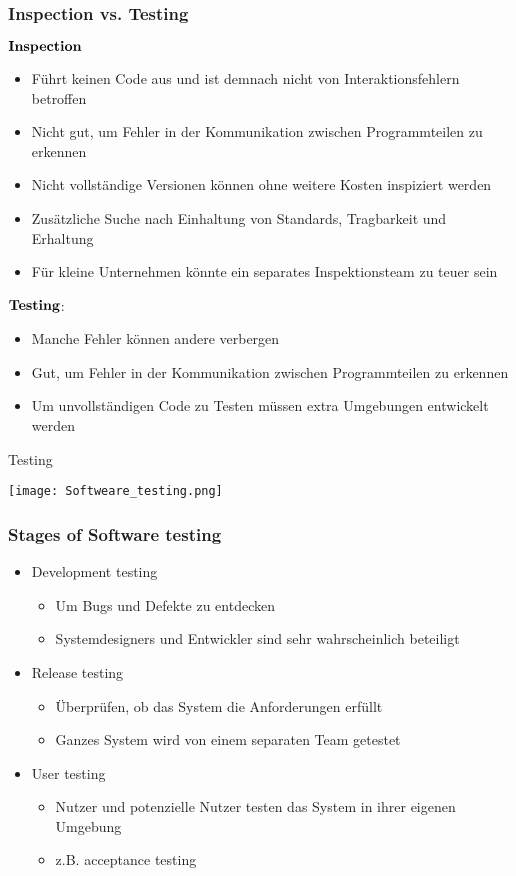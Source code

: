 \subsubsection{Inspection vs. Testing}
\begin{multicols}{2}
$\bold{Inspection}$	
\begin{itemize}
	\item Führt keinen Code aus und ist demnach nicht von Interaktionsfehlern betroffen
	\item Nicht gut, um Fehler in der Kommunikation zwischen Programmteilen zu erkennen
	\item Nicht vollständige Versionen können ohne weitere Kosten inspiziert werden
	\item Zusätzliche Suche nach Einhaltung von Standards, Tragbarkeit und Erhaltung
	\item Für kleine Unternehmen könnte ein separates Inspektionsteam zu teuer sein
\end{itemize}
\columnbreak
$\bold{Testing}$:
\begin{itemize}
	\item Manche Fehler können andere verbergen
	\item Gut, um Fehler in der Kommunikation zwischen Programmteilen zu erkennen
	\item Um unvollständigen Code zu Testen müssen extra Umgebungen entwickelt werden
\end{itemize}
\end{multicols}
\begin{table}[H]
\caption{Testing}
\texttt{[image: Softweare\_testing.png]}	
\end{table}
\subsubsection{Stages of Software testing}
\begin{itemize}
	\item Development testing
		\begin{itemize}
			\item Um Bugs und Defekte zu entdecken
			\item Systemdesigners und Entwickler sind sehr wahrscheinlich beteiligt
		\end{itemize}
	\item Release testing
		\begin{itemize}
			\item Überprüfen, ob das System die Anforderungen erfüllt
			\item Ganzes System wird von einem separaten Team getestet
		\end{itemize}
	\item User testing
		\begin{itemize}
			\item Nutzer und potenzielle Nutzer testen das System in ihrer eigenen Umgebung
			\item z.B. acceptance testing
		\end{itemize}
\end{itemize}
